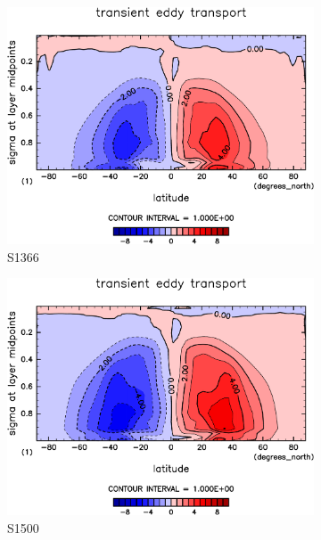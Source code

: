 \documentclass[body]{subfiles}
\begin{document}
\begin{figure}[t]
	\centering
	\begin{subfigure}{.4\textwidth}
		\centering
		\includegraphics[width=\columnwidth]{S1366/MeriHeatTransTest@latentEn_TE,time=14600:14965-crop-rotate.pdf}
		\caption{S1366}\label{潜熱移動性擾乱S1366}
	\end{subfigure}
	\begin{subfigure}{.4\textwidth}
		\centering
		\includegraphics[width=\columnwidth]{S1500/MeriHeatTransTest@latentEn_TE,time=3650:4015-crop-rotate.pdf}
		\caption{S1500}\label{潜熱移動性擾乱S1500}
	\end{subfigure}
	\begin{subfigure}{.4\textwidth}

\end{subfigure}
\end{figure}
\end{document}

